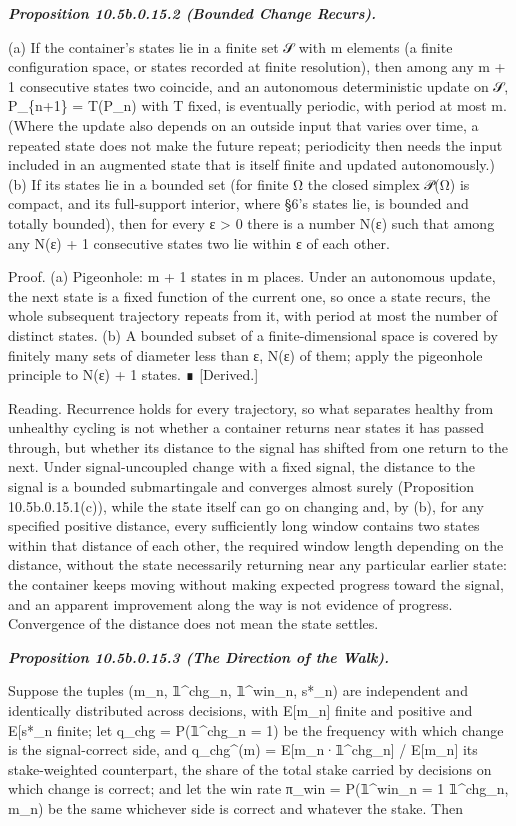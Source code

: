 \documentclass[
]{article}
\begin{document}
\emph{\textbf{Proposition 10.5b.0.15.2 (Bounded Change Recurs).}}

(a) If the container's states lie in a finite set 𝒮 with m elements (a
finite configuration space, or states recorded at finite resolution),
then among any m + 1 consecutive states two coincide, and an autonomous
deterministic update on 𝒮, P\_\{n+1\} = T(P\_n) with T fixed, is
eventually periodic, with period at most m. (Where the update also
depends on an outside input that varies over time, a repeated state does
not make the future repeat; periodicity then needs the input included in
an augmented state that is itself finite and updated autonomously.) (b)
If its states lie in a bounded set (for finite Ω the closed simplex 𝒫(Ω)
is compact, and its full-support interior, where §6's states lie, is
bounded and totally bounded), then for every ε \textgreater{} 0 there is
a number N(ε) such that among any N(ε) + 1 consecutive states two lie
within ε of each other.

Proof. (a) Pigeonhole: m + 1 states in m places. Under an autonomous
update, the next state is a fixed function of the current one, so once a
state recurs, the whole subsequent trajectory repeats from it, with
period at most the number of distinct states. (b) A bounded subset of a
finite-dimensional space is covered by finitely many sets of diameter
less than ε, N(ε) of them; apply the pigeonhole principle to N(ε) + 1
states. ∎ {[}Derived.{]}

Reading. Recurrence holds for every trajectory, so what separates
healthy from unhealthy cycling is not whether a container returns near
states it has passed through, but whether its distance to the signal has
shifted from one return to the next. Under signal-uncoupled change with
a fixed signal, the distance to the signal is a bounded submartingale
and converges almost surely (Proposition 10.5b.0.15.1(c)), while the
state itself can go on changing and, by (b), for any specified positive
distance, every sufficiently long window contains two states within that
distance of each other, the required window length depending on the
distance, without the state necessarily returning near any particular
earlier state: the container keeps moving without making expected
progress toward the signal, and an apparent improvement along the way is
not evidence of progress. Convergence of the distance does not mean the
state settles.

\emph{\textbf{Proposition 10.5b.0.15.3 (The Direction of the Walk).}}

Suppose the tuples (m\_n, 𝟙\^{}chg\_n, 𝟙\^{}win\_n, s*\_n) are
independent and identically distributed across decisions, with
E{[}m\_n{]} finite and positive and E{[}\textbar s*\_n\textbar{]}
finite; let q\_chg = P(𝟙\^{}chg\_n = 1) be the frequency with which
change is the signal-correct side, and q\_chg\^{}(m) =
E{[}m\_n·𝟙\^{}chg\_n{]} / E{[}m\_n{]} its stake-weighted counterpart,
the share of the total stake carried by decisions on which change is
correct; and let the win rate π\_win = P(𝟙\^{}win\_n = 1 \textbar{}
𝟙\^{}chg\_n, m\_n) be the same whichever side is correct and whatever
the stake. Then
\end{document}

